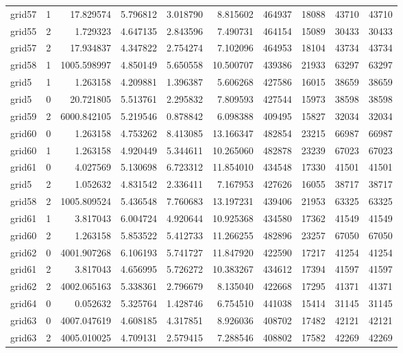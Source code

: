 \begin{longtable}{|l|r|r|r|r|r|r|r|r|r|}
grid57 & 1 & 17.829574 & 5.796812 & 3.018790 & 8.815602 & 464937 & 18088 & 43710 & 43710 \\
grid55 & 2 & 1.729323 & 4.647135 & 2.843596 & 7.490731 & 464154 & 15089 & 30433 & 30433 \\
grid57 & 2 & 17.934837 & 4.347822 & 2.754274 & 7.102096 & 464953 & 18104 & 43734 & 43734 \\
grid58 & 1 & 1005.598997 & 4.850149 & 5.650558 & 10.500707 & 439386 & 21933 & 63297 & 63297 \\
grid5 & 1 & 1.263158 & 4.209881 & 1.396387 & 5.606268 & 427586 & 16015 & 38659 & 38659 \\
grid5 & 0 & 20.721805 & 5.513761 & 2.295832 & 7.809593 & 427544 & 15973 & 38598 & 38598 \\
grid59 & 2 & 6000.842105 & 5.219546 & 0.878842 & 6.098388 & 409495 & 15827 & 32034 & 32034 \\
grid60 & 0 & 1.263158 & 4.753262 & 8.413085 & 13.166347 & 482854 & 23215 & 66987 & 66987 \\
grid60 & 1 & 1.263158 & 4.920449 & 5.344611 & 10.265060 & 482878 & 23239 & 67023 & 67023 \\
grid61 & 0 & 4.027569 & 5.130698 & 6.723312 & 11.854010 & 434548 & 17330 & 41501 & 41501 \\
grid5 & 2 & 1.052632 & 4.831542 & 2.336411 & 7.167953 & 427626 & 16055 & 38717 & 38717 \\
grid58 & 2 & 1005.809524 & 5.436548 & 7.760683 & 13.197231 & 439406 & 21953 & 63325 & 63325 \\
grid61 & 1 & 3.817043 & 6.004724 & 4.920644 & 10.925368 & 434580 & 17362 & 41549 & 41549 \\
grid60 & 2 & 1.263158 & 5.853522 & 5.412733 & 11.266255 & 482896 & 23257 & 67050 & 67050 \\
grid62 & 0 & 4001.907268 & 6.106193 & 5.741727 & 11.847920 & 422590 & 17217 & 41254 & 41254 \\
grid61 & 2 & 3.817043 & 4.656995 & 5.726272 & 10.383267 & 434612 & 17394 & 41597 & 41597 \\
grid62 & 2 & 4002.065163 & 5.338361 & 2.796679 & 8.135040 & 422668 & 17295 & 41371 & 41371 \\
grid64 & 0 & 0.052632 & 5.325764 & 1.428746 & 6.754510 & 441038 & 15414 & 31145 & 31145 \\
grid63 & 0 & 4007.047619 & 4.608185 & 4.317851 & 8.926036 & 408702 & 17482 & 42121 & 42121 \\
grid63 & 2 & 4005.010025 & 4.709131 & 2.579415 & 7.288546 & 408802 & 17582 & 42269 & 42269 \\

\end{longtable}
